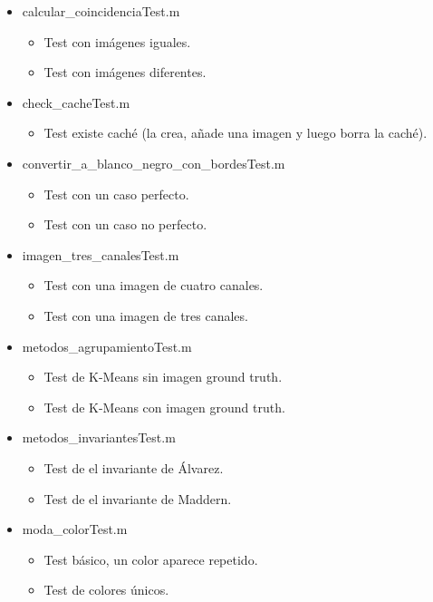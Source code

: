 \begin{itemize}
\begin{itemize}
    \end{itemize}
    \item calcular\_coincidenciaTest.m
    \begin{itemize}
        \item Test con imágenes iguales.
        \item Test con imágenes diferentes.
    \end{itemize}
    \item check\_cacheTest.m
    \begin{itemize}
        \item Test existe caché (la crea, añade una imagen y luego borra la caché).
    \end{itemize}
    \item convertir\_a\_blanco\_negro\_con\_bordesTest.m
    \begin{itemize}
        \item Test con un caso perfecto.
        \item Test con un caso no perfecto.
    \end{itemize}
    \item imagen\_tres\_canalesTest.m
    \begin{itemize}
        \item Test con una imagen de cuatro canales.
        \item Test con una imagen de tres canales.
    \end{itemize}
    \item metodos\_agrupamientoTest.m
    \begin{itemize}
        \item Test de K-Means sin imagen ground truth.
        \item Test de K-Means con imagen ground truth.
    \end{itemize}
    \item metodos\_invariantesTest.m
    \begin{itemize}
        \item Test de el invariante de Álvarez.
        \item Test de el invariante de Maddern.
    \end{itemize}
    \item moda\_colorTest.m
    \begin{itemize}
        \item Test básico, un color aparece repetido.
        \item Test de colores únicos.
    \end{itemize}

\end{itemize}
